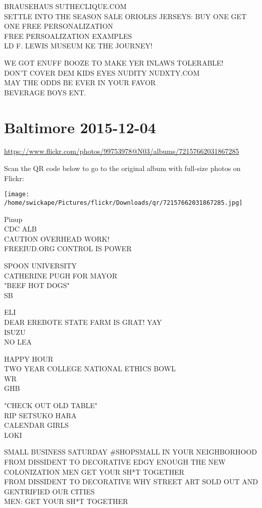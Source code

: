 \documentclass[10pt,letterpaper]{article}
\begin{document}
BRAUSEHAUS SUTHECLIQUE.COM\\
SETTLE INTO THE SEASON SALE ORIOLES JERSEYS: BUY ONE GET ONE FREE PERSONALIZATION\\
FREE PERSOALIZATION EXAMPLES\\
LD F. LEWIS MUSEUM KE THE JOURNEY!

WE GOT ENUFF BOOZE TO MAKE YER INLAWS TOLERABLE!\\
DON'T COVER DEM KIDS EYES NUDITY NUDXTY.COM\\
MAY THE ODDS BE EVER IN YOUR FAVOR\\
BEVERAGE BOYS ENT.


\section*{Baltimore 2015-12-04}

\url{https://www.flickr.com/photos/99753978@N03/albums/72157662031867285}

Scan the QR code below to go to the original album with full-size photos on Flickr:

\texttt{[image: /home/swickape/Pictures/flickr/Downloads/qr/72157662031867285.jpg]}


Pinup\\
CDC ALB\\
CAUTION OVERHEAD WORK!\\
FREEIUD.ORG CONTROL IS POWER

SPOON UNIVERSITY\\
CATHERINE PUGH FOR MAYOR\\
"BEEF HOT DOGS"\\
SB

ELI\\
DEAR EREBOTE STATE FARM IS GRAT!  YAY\\
ISUZU\\
NO LEA

HAPPY HOUR\\
TWO YEAR COLLEGE NATIONAL ETHICS BOWL\\
WR\\
GHB

"CHECK OUT OLD TABLE"\\
RIP SETSUKO HARA\\
CALENDAR GIRLS\\
LOKI

SMALL BUSINESS SATURDAY \#SHOPSMALL IN YOUR NEIGHBORHOOD\\
FROM DISSIDENT TO DECORATIVE EDGY ENOUGH THE NEW COLONIZATION MEN GET YOUR SH*T TOGETHER\\
FROM DISSIDENT TO DECORATIVE WHY STREET ART SOLD OUT AND GENTRIFIED OUR CITIES\\
MEN: GET YOUR SH*T TOGETHER
\end{document}
